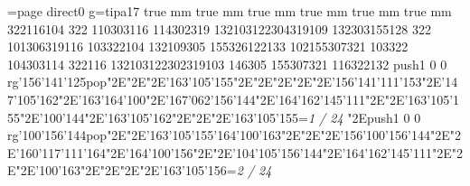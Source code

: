 \chardef\match=\pdfcolorstackinit page direct{0 g}\nopagenumbers\font\ipa=tipa17 true mm true mm true mm true mm true mm true mm
\null\vfill{} 322116104 322 110303116\bigskip{} 114302319 132103122304319109\bigskip{} 132303155128 322 101306319116 103322104 132109305 155326122133\bigskip{} 102155307321 103322 104303114 322116 132103122302319103\bigskip{} 146305 155307321 116322132\bigskip\vfill\eject
\null\vfill\pdfcolorstack\match push{1 0 0 rg}\ipa\char'156\ipa\char'141\ipa\char'125\pdfcolorstack\match pop{}\ipa\char"2E\enskip\enskip\enskip\ipa\char"2E\enskip\ipa\char"2E\ipa\char'163\ipa\char'105\ipa\char'155\bigskip\enskip\enskip\enskip\ipa\char"2E\enskip\enskip\enskip\ipa\char"2E\enskip\enskip\enskip\enskip\enskip\enskip\bigskip\enskip\enskip\ipa\char"2E\enskip\enskip\enskip\enskip\ipa\char"2E\enskip\ipa\char"2E\ipa\char'156\ipa\char'141\ipa\char'111\ipa\char'153\ipa\char"2E\ipa\char'147\ipa\char'105\ipa\char'162\ipa\char"2E\ipa\char'163\ipa\char'164\ipa\char'100\ipa\char"2E\ipa\char'167\ipa\char'062\ipa\char'156\ipa\char'144\bigskip\enskip\ipa\char"2E\ipa\char'164\ipa\char'162\ipa\char'145\ipa\char'111\ipa\char"2E\enskip\enskip\ipa\char"2E\ipa\char'163\ipa\char'105\ipa\char'155\ipa\char"2E\ipa\char'100\ipa\char'144\ipa\char"2E\enskip\enskip\enskip\enskip\enskip\enskip\bigskip\ipa\char'163\ipa\char'105\ipa\char'162\ipa\char"2E\enskip\enskip\ipa\char"2E\enskip\enskip\enskip\ipa\char"2E\ipa\char'163\ipa\char'105\ipa\char'155\bigskip\vfill\footline={\hfill\tenrm\it 1 / 24}\eject
\null\vfill\enskip\enskip\enskip\ipa\char"2E\pdfcolorstack\match push{1 0 0 rg}\ipa\char'100\ipa\char'156\ipa\char'144\pdfcolorstack\match pop{}\ipa\char"2E\enskip\ipa\char"2E\ipa\char'163\ipa\char'105\ipa\char'155\bigskip\ipa\char'164\ipa\char'100\ipa\char'163\ipa\char"2E\enskip\enskip\enskip\ipa\char"2E\enskip\enskip\enskip\enskip\enskip\enskip\bigskip\enskip\enskip\ipa\char"2E\ipa\char'156\ipa\char'100\ipa\char'156\ipa\char'144\ipa\char"2E\enskip\ipa\char"2E\ipa\char'160\ipa\char'117\ipa\char'111\ipa\char'164\ipa\char"2E\ipa\char'164\ipa\char'100\ipa\char'156\ipa\char"2E\enskip\enskip\enskip\ipa\char"2E\ipa\char'104\ipa\char'105\ipa\char'156\ipa\char'144\bigskip\enskip\ipa\char"2E\ipa\char'164\ipa\char'162\ipa\char'145\ipa\char'111\ipa\char"2E\enskip\enskip\ipa\char"2E\enskip\enskip\enskip\ipa\char"2E\ipa\char'100\ipa\char'163\ipa\char"2E\enskip\enskip\enskip\enskip\enskip\enskip\bigskip\enskip\enskip\enskip\ipa\char"2E\enskip\enskip\ipa\char"2E\enskip\enskip\enskip\ipa\char"2E\ipa\char'163\ipa\char'105\ipa\char'156\bigskip\vfill\footline={\hfill\tenrm\it 2 / 24}\eject
